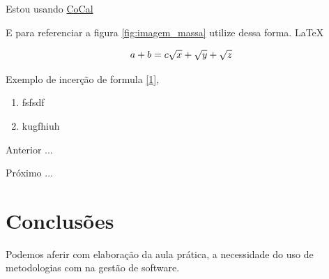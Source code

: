 \par Estou usando \href {https://cocalc.com/} {CoCal}

E para referenciar a figura \ref{fig:imagem_massa} utilize dessa forma. \LaTeX

\begin{equation}
  a + b = c \label{1}
  $$ $$ %
  \sqrt{x} + \sqrt{\smash[b]{y}} + \sqrt{z}
\end{equation}


\par Exemplo de incerção de formula \eqref{1},





\begin{enumerate}[label=\Roman{*}, ref=(\roman{*})]
  \item fsfsdf
  \item kugfhiuh
\end{enumerate}

\begin{asparaenum}
\item Anterior ...
\item Próximo ... \label{pl1}
\end{asparaenum}


\section{Conclusões}

\par Podemos aferir com elaboração da aula prática, a necessidade do uso de metodologias com na gestão de software.



